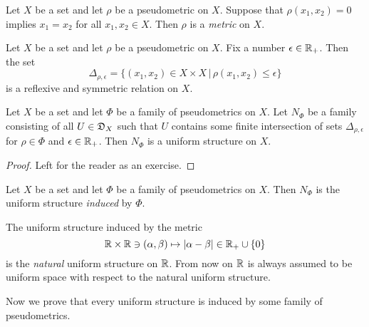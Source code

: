 \documentclass[10pt]{amsart}
\begin{document}
\begin{definition}
	Let $X$ be a set and let $\rho$ be a pseudometric on $X$. Suppose that $\rho(x_1,x_2) = 0$ implies $x_1 = x_2$ for all $x_1,x_2 \in X$. Then $\rho$ is a \textit{metric} on $X$.
\end{definition}
\noindent
Let $X$ be a set and let $\rho$ be a pseudometric on $X$. Fix a number $\epsilon \in {\mathbb R}_+$. Then the set
$$\Delta_{\rho, \epsilon} = \big\{(x_1,x_2) \in X\times X\,\big|\,\rho(x_1, x_2) \leq \epsilon \big\}$$
is a reflexive and symmetric relation on $X$.

\begin{fact}\label{fact:uniform_structures_induced_by_families_of_pseudometrics}
	Let $X$ be a set and let $\Phi$ be a family of pseudometrics on $X$. Let $N_{\Phi}$ be a family consisting of all $U\in {\mathfrak D}_X$ such that $U$ contains some finite intersection of sets $\Delta_{\rho, \epsilon}$ for $\rho \in \Phi$ and $\epsilon \in {\mathbb R}_+$. Then $N_{\Phi}$ is a uniform structure on $X$.
\end{fact}
\begin{proof}
	Left for the reader as an exercise.
\end{proof}

\begin{definition}
	Let $X$ be a set and let $\Phi$ be a family of pseudometrics on $X$. Then $N_{\Phi}$ is the uniform structure \textit{induced} by $\Phi$.
\end{definition}

\begin{example}\label{example:natural_uniform_structure_on_reals}
	The uniform structure induced by the metric
	$${\mathbb R}\times {\mathbb R} \ni (\alpha, \beta) \mapsto |\alpha - \beta| \in {\mathbb R}_+\cup \{0\}$$
	is the \textit{natural} uniform structure on ${\mathbb R}$. From now on ${\mathbb R}$ is always assumed to be uniform space with respect to the natural uniform structure.
\end{example}
\noindent
Now we prove that every uniform structure is induced by some family of pseudometrics.
\end{document}

